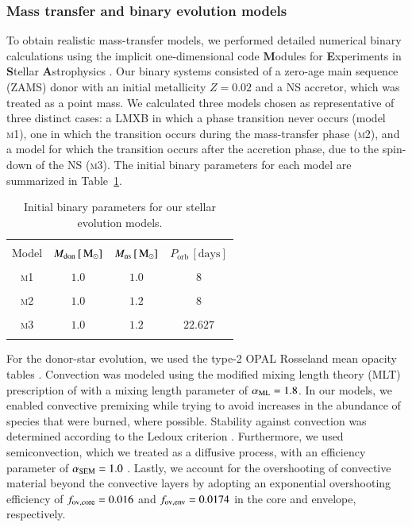 \documentclass[main.tex]{subfiles}
\begin{document}
    
    
    \subsubsection{Mass transfer and binary evolution models} \label{sec:ch4:input_params}
    To obtain realistic mass-transfer models, we performed detailed numerical binary calculations using the implicit one-dimensional code \textbf{M}odules for \textbf{E}xperiments in \textbf{S}tellar \textbf{A}strophysics \citep[\mesa\,v12778;][]{Paxton:2010ji,Paxton:2013pj,Paxton:2015jva,Paxton:2017eie}. Our binary systems consisted of a zero-age main sequence (ZAMS) donor with an initial metallicity $Z=0.02$ and a NS accretor, which was treated as a point mass.
    We calculated three models chosen as representative of three distinct cases: a LMXB in which a phase transition never occurs (model \textsc{m1}), one in which the transition occurs during the mass-transfer phase (\textsc{m2}), and a model for which the transition occurs after the accretion phase, due to the spin-down of the NS (\textsc{m3}). The initial binary parameters for each model are summarized in Table~\ref{tab:config}.
    
    \begin{table}[t]
        \centering
        \caption{Initial binary parameters for our stellar evolution models.}
        \begin{tabular}{cccc}
             \hline \hline \\
             Model & $M_\mathrm{don}\,[\mathrm{\,M_\odot}]$ & $M_\mathrm{ns}\,[\mathrm{\,M_\odot}]$ & $P_\mathrm{orb}\,[\mathrm{days}]$  \\
             \hline \\
            \textsc{m1} & $1.0$ & $1.0$ & $8$ \\\\
            \textsc{m2} & $1.0$ & $1.2$ & $8$ \\\\
            \textsc{m3} & $1.0$ & $1.2$ & $22.627$ \\\\
            \hline
        \end{tabular}
        \label{tab:config}
    \end{table}
    
    For the donor-star evolution, we used the type-2 OPAL Rosseland mean opacity tables \citep{opal_opacities}. Convection was modeled using the modified mixing length theory (MLT) prescription of \cite{Henyey:apj1965} with a mixing length parameter of $\alpha_{\rm ML} = 1.8$. In our models, we enabled convective premixing while trying to avoid increases in the abundance of species that were burned, where possible. Stability against convection was determined according to the Ledoux criterion \citep[][]{Ledoux:apj1947}. Furthermore, we used semiconvection, which we treated as a diffusive process, with an efficiency parameter of $\alpha_{\rm SEM} = 1.0$ \citep[][]{Langer:aap1991}. Lastly, we account for the overshooting of convective material beyond the convective layers by adopting an exponential overshooting efficiency of $f_{\rm ov, core} = 0.016$ and $f_{\rm ov, env} = 0.0174$ in the core and envelope, respectively. 
    
\end{document}
